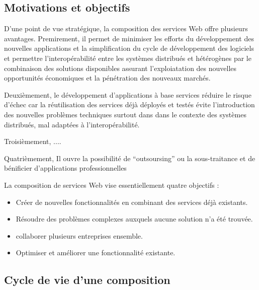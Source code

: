     \subsection{Motivations et objectifs}
    \label{sec:objectifs}
    
    D'une point de vue stratégique, la composition des services Web
    offre plusieurs avantages. Premirement, il permet de minimiser les
    efforts du développement des nouvelles applications et la
    simplification du cycle de développement des logiciels et
    permettre l'interopérabilité entre les systèmes distribués et
    hétérogènes par le combinaison des solutions disponibles assurant
    l'exploiatation des nouvelles opportunités économiques et la
    pénétration des nouveaux marchés.

    Deuxièmement, le développement d'applications à base services
    réduire le risque d'échec car la réutilisation des services déjà
    déployés et testés évite l'introduction des nouvelles problèmes
    techniques surtout dans dans le contexte des systèmes distribués,
    mal adaptées à l'interopérabilité.

    Troisièmement, .... 
    
    Quatrièmement, Il ouvre la possibilité de ``outsoursing'' ou la
    sous-traitance et de bénificier d'applications professionnelles
    \cite{medjahed2004thesis}

    La composition de services Web vise essentiellement quatre
    objectifs \cite{driss2011approche}:
    \begin{itemize}

      \item Créer de nouvelles fonctionnalités en combinant des services
        déjà existants.

      \item Résoudre des problèmes complexes auxquels aucune solution
        n'a été trouvée.

      \item collaborer plusieurs entreprises ensemble.

      \item Optimiser et améliorer une fonctionnalité existante.
    \end{itemize}

    \subsection{Cycle de vie d'une composition}
    \label{sec:cycle-de-vie}
    \newpage

